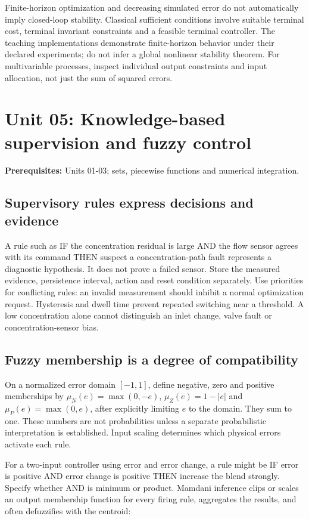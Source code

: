 \documentclass[11pt,a4paper]{article}
\begin{document}
Finite-horizon optimization and decreasing simulated error do not automatically imply closed-loop stability. Classical sufficient conditions involve suitable terminal cost, terminal invariant constraints and a feasible terminal controller. The teaching implementations demonstrate finite-horizon behavior under their declared experiments; do not infer a global nonlinear stability theorem. For multivariable processes, inspect individual output constraints and input allocation, not just the sum of squared errors.

\clearpage\section{Unit 05: Knowledge-based supervision and fuzzy control}
\textbf{Prerequisites:} Units 01-03; sets, piecewise functions and numerical integration.

\subsection{Supervisory rules express decisions and evidence}

A rule such as IF the concentration residual is large AND the flow sensor agrees with its command THEN suspect a concentration-path fault represents a diagnostic hypothesis. It does not prove a failed sensor. Store the measured evidence, persistence interval, action and reset condition separately. Use priorities for conflicting rules: an invalid measurement should inhibit a normal optimization request. Hysteresis and dwell time prevent repeated switching near a threshold. A low concentration alone cannot distinguish an inlet change, valve fault or concentration-sensor bias.


\subsection{Fuzzy membership is a degree of compatibility}

On a normalized error domain $[-1,1]$, define negative, zero and positive memberships by $\mu_N(e)=\max(0,-e)$, $\mu_Z(e)=1-|e|$ and $\mu_P(e)=\max(0,e)$, after explicitly limiting $e$ to the domain. They sum to one. These numbers are not probabilities unless a separate probabilistic interpretation is established. Input scaling determines which physical errors activate each rule.


For a two-input controller using error and error change, a rule might be IF error is positive AND error change is positive THEN increase the blend strongly. Specify whether AND is minimum or product. Mamdani inference clips or scales an output membership function for every firing rule, aggregates the results, and often defuzzifies with the centroid:
\end{document}
